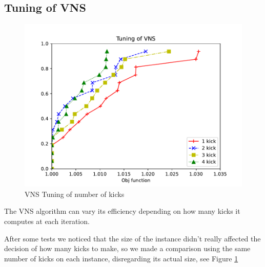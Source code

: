 \subsection{Tuning of VNS}

\begin{figure}[!h]
    \centering
    \includegraphics[width=\textwidth]{images/vns.pdf}
    \caption{VNS Tuning of number of kicks}
    \label{fig:vns}
\end{figure}

The VNS algorithm can vary its efficiency depending on how many kicks it computes at each iteration.

After some tests we noticed that the size of the instance didn't really affected the decision of how many kicks to make, so we made a comparison using the same number of kicks on each instance, disregarding its actual size, see Figure \ref*{fig:vns}

